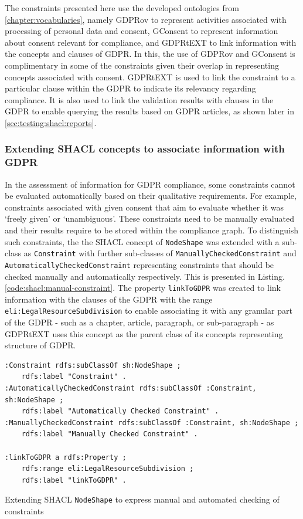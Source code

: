 The constraints presented here use the developed ontologies from \autoref{chapter:vocabularies}, namely GDPRov to represent activities associated with processing of personal data and consent, GConsent to represent information about consent relevant for compliance, and GDPRtEXT to link information with the concepts and clauses of GDPR.
In this, the use of GDPRov and GConsent is complimentary in some of the constraints given their overlap in representing concepts associated with consent.
GDPRtEXT is used to link the constraint to a particular clause within the GDPR to indicate its relevancy regarding compliance. It is also used to link the validation results with clauses in the GDPR to enable querying the results based on GDPR articles, as shown later in \autoref{sec:testing:shacl:reports}.

\subsubsection{Extending SHACL concepts to associate information with GDPR}
In the assessment of information for GDPR compliance, some constraints cannot be evaluated automatically based on their qualitative requirements. For example, constraints associated with given consent that aim to evaluate whether it was `freely given' or `unambiguous'. These constraints need to be manually evaluated and their results require to be stored within the compliance graph.
To distinguish such constraints, the the SHACL concept of \texttt{NodeShape} was extended with a sub-class as \texttt{Constraint} with further sub-classes of \texttt{ManuallyCheckedConstraint} and \texttt{AutomaticallyCheckedConstraint} representing constraints that should be checked manually and automatically respectively. This is presented in Listing.\autoref{code:shacl:manual-constraint}.
The property \texttt{linkToGDPR} was created to link information with the clauses of the GDPR with the range \texttt{eli:LegalResourceSubdivision} to enable associating it with any granular part of the GDPR - such as a chapter, article, paragraph, or sub-paragraph - as GDPRtEXT uses this concept as the parent class of its concepts representing structure of GDPR.
\begin{listing}[htbp]
\begin{verbatim}
:Constraint rdfs:subClassOf sh:NodeShape ;
    rdfs:label "Constraint" .
:AutomaticallyCheckedConstraint rdfs:subClassOf :Constraint, sh:NodeShape ;
    rdfs:label "Automatically Checked Constraint" .
:ManuallyCheckedConstraint rdfs:subClassOf :Constraint, sh:NodeShape ;
    rdfs:label "Manually Checked Constraint" .
    
:linkToGDPR a rdfs:Property ;
    rdfs:range eli:LegalResourceSubdivision ;
    rdfs:label "linkToGDPR" .
\end{verbatim}
\caption{Extending SHACL \texttt{NodeShape} to express manual and automated checking of constraints}
\label{code:shacl:manual-constraint}
\end{listing}

